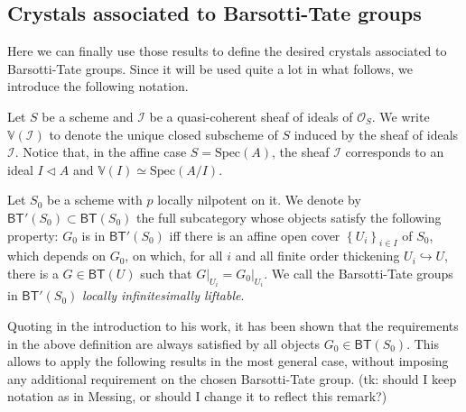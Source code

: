 \subsection{Crystals associated to Barsotti-Tate groups}
Here we can finally use those results to define the desired crystals
associated to Barsotti-Tate groups.
Since it will be used quite a lot in what follows,
we introduce the following notation.


\begin{ntt}
	Let $S$ be a scheme and $\mathcal{I}$ be a quasi-coherent sheaf of
	ideals of $\mathcal{O}_{ S }$.
	We write $\mathbb{V}(\mathcal{I})$ to denote the unique
	closed subscheme of $S$ induced by the sheaf of ideals $\mathcal{I}$.
	Notice that, in the affine case $S = \mathrm{Spec}(A)$,
	the sheaf $\mathcal{I}$ corresponds to an ideal $I \triangleleft A$
	and $\mathbb{V}(I) \simeq \mathrm{Spec}(A/I)$.
\end{ntt} 


\begin{defn}\label{defn:LILBTG}
	Let $S_0$ be a scheme with $p$ locally nilpotent on it.
	We denote by $\mathsf{BT}'(S_0) \subset \mathsf{BT}(S_0)$ 
	the full subcategory whose objects satisfy the following property:
	$G_0$ is in $\mathsf{BT}'(S_0)$ iff
	there is an affine open cover $\left\{ U_i \right\}_{i \in I}$ of $S_0$, which depends on $G_0$, 
	on which, for all $i$ and all finite order thickening $U_i \hookrightarrow U$,
	there is a $G \in \mathsf{BT}(U)$ such that
	$\left.G\right|_{U_i} = \left.G_0\right|_{U_i}$.
	We call the Barsotti-Tate groups in $\mathsf{BT}'(S_0)$
	{\em locally infinitesimally liftable}.
\end{defn}


\begin{rem}[]\label{rem:LocallyLiftableBTG}
	Quoting \cite{Messing} in the introduction to his work, it has been shown
	that the requirements in the above definition are always satisfied by 
	all objects $G_0 \in \mathsf{BT}(S_0)$.
	This allows to apply the following results in the most general case,
	without imposing any additional requirement on the chosen Barsotti-Tate group.
	(tk: should I keep notation as in Messing, or should I change it to reflect this remark?)	
\end{rem}



